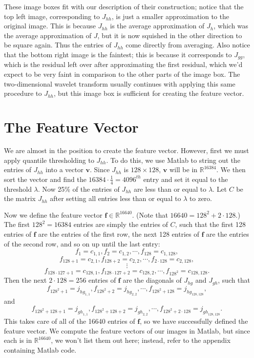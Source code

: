 \documentclass[11 pt]{article}
\begin{document}
These image boxes fit with our description of their construction; notice that the top left image, corresponding to $J_{hh}$, is just a smaller approximation to the original image. This is because $J_{hh}$ is the average approximation of $J_h$, which was the average approximation of $J$, but it is now squished in the other direction to be square again. Thus the entries of $J_{hh}$ come directly from averaging. Also notice that the bottom right image is the faintest; this is because it corresponds to $J_{gg}$, which is the residual left over after approximating the first residual, which we'd expect to be very faint in comparison to the other parts of the image box. The two-dimensional wavelet transform usually continues with applying this same procedure to $J_{hh}$, but this image box is sufficient for creating the feature vector.

\section{The Feature Vector}

\indent\indent We are almost in the position to create the feature vector. However, first we must apply quantile thresholding to $J_{hh}$. To do this, we use Matlab to string out the entries of $J_{hh}$ into a vector $\mathbf{v}$. Since $J_{hh}$ is $128\times 128$, $\mathbf{v}$ will be in $\mathbb{R}^{16384}$. We then sort the vector and find the $16384\cdot \frac{1}{4} = 4096^{th}$ entry and set it equal to the threshold $\lambda$. Now 25\% of the entries of $J_{hh}$ are less than or equal to $\lambda$. Let $C$ be the matrix $J_{hh}$ after setting all entries less than or equal to $\lambda$ to zero.

Now we define the feature vector $\mathbf{f} \in\mathbb{R}^{16640}$. (Note that $16640=128^2+2\cdot 128$.) The first $128^2=16384$ entries are simply the entries of $C$, such that the first 128 entries of $\mathbf{f}$ are the entries of the first row, the next 128 entries of $\mathbf{f}$ are the entries of the second row, and so on up until the last entry: $$f_1=c_{1,1},f_2=c_{1,2},\cdots, f_{128}=c_{1,128},$$ $$f_{128+1}=c_{2,1}, f_{128+2}=c_{2,2},\cdots, f_{2\cdot128}=c_{2,128},$$ $$\vdots$$ $$f_{128\cdot127+1}= c_{128,1},f_{128\cdot 127+2}=c_{128,2},\cdots, f_{128^2}=c_{128,128}.$$ Then the next $2\cdot 128=256$ entries of $\mathbf{f}$ are the diagonals of $J_{hg}$ and $J_{gh}$, such that $$f_{128^2+1}=j_{{hg}_{1,1}}, f_{128^2+2}=j_{{hg}_{2,2}}, \cdots, f_{128^2+128}=j_{{hg}_{128,128}},$$ and $$f_{128^2+128+1}=j_{{gh}_{1,1}}, f_{128^2+128+2}=j_{{gh}_{2,2}}, \cdots, f_{128^2+2\cdot 128}=j_{{gh}_{128,128}}.$$
This takes care of all of the 16640 entries of $\mathbf{f}$, so we have successfully defined the feature vector. We compute the feature vectors of our images in Matlab, but since each is in $\mathbb{R}^{16640}$, we won't list them out here; instead, refer to the appendix containing Matlab code.
\end{document}
